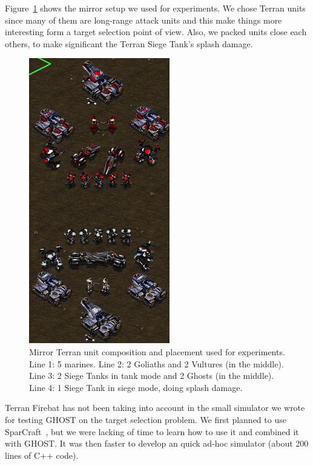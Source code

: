 \documentclass[journal]{IEEEtran}
\newcommand{\ghost}{\textsc{GHOST}\xspace}
\begin{document}
Figure~\ref{fig:target}   shows  the   mirror   setup   we  used   for
experiments. We chose  Terran units since many of  them are long-range
attack  units and  this make  things  more interesting  form a  target
selection point of  view. Also, we packed units close  each others, to
make significant the Terran Siege Tank's splash damage.
\begin{figure}[!h]
  \centering
  \includegraphics[width=0.7\columnwidth]{figs/target_setup.png}
  \caption{Mirror  Terran  unit  composition and  placement  used  for
    experiments. Line 1: 5 marines. Line  2: 2 Goliaths and 2 Vultures
    (in the middle). Line  3: 2 Siege Tanks in tank  mode and 2 Ghosts
    (in the middle). Line 4: 1  Siege Tank in siege mode, doing splash
    damage.}
  \label{fig:target}
\end{figure}
Terran Firebat has not been taking into account in the small simulator
we wrote for testing \ghost on the target selection problem.  We first
planned    to    use   SparCraft~\cite{ChurchillB11,    ChurchillSB12,
  ChurchillB12}, but  we were lacking of  time to learn how  to use it
and combined  it with \ghost. It  was then faster to  develop an quick
ad-hoc simulator (about 200 lines of C++ code). 
\end{document}
